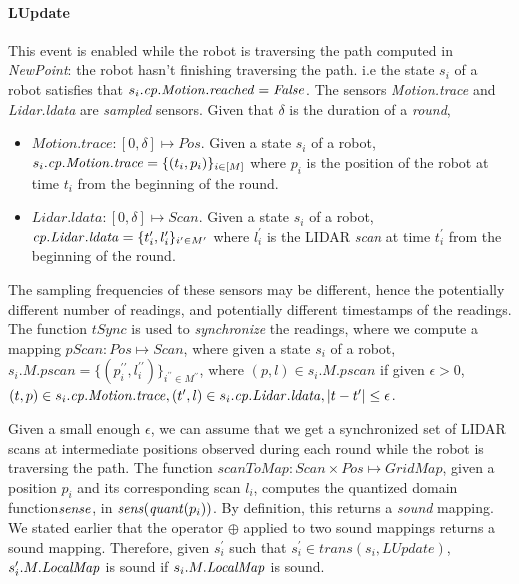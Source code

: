 \paragraph{LUpdate}
This event is enabled while the robot is traversing the path computed in \emph{NewPoint}: the robot hasn't finishing traversing the path. i.e the state $s_i$ of a robot satisfies that $s_i.\mathit{cp}.\mathit{Motion.reached}  = \mathit{False}$. The sensors \emph{Motion.trace} and \emph{Lidar.ldata} are \emph{sampled} sensors. Given that $\delta$ is the duration of a \emph{round},
\begin{itemize}
    \item $\mathit{Motion.trace}: [0,\delta] \mapsto \mathit{Pos}$. Given a state $s_i$ of a robot,  $s_i.\mathit{cp}.\mathit{Motion.trace} = \{(t_i, p_i)\}_{i \in [M]}$ where $p_i$ is the position of the robot at time $t_i$ from the beginning of the round.
    \item  $\mathit{Lidar.ldata} : [0,\delta]\mapsto \mathit{Scan}$. Given a state $s_i$ of a robot, $\mathit{cp}.\mathit{Lidar.ldata} = \{t_i^\prime, l_i^\prime\}_{i^\prime \in M^\prime}$ where $l_i^\prime$ is the LIDAR \emph{scan} at time $t_i^\prime$ from the beginning of the round.
\end{itemize}
The sampling frequencies of these sensors may be different, hence the potentially different number of readings, and potentially different timestamps of the readings. The function $\mathit{tSync}$ is used to \emph{synchronize} the readings, where we compute a mapping $\mathit{pScan}: \mathit{Pos} \mapsto \mathit{Scan}$, where given a state $s_i$ of a robot, $s_i.M.\mathit{pscan} = \{(p_i^{\prime\prime}, l_i^{\prime\prime})\}_{i^{\prime\prime} \in M ^{\prime\prime}}$, where  $(p, l) \in s_i.M.\mathit{pscan}$ if given $\epsilon > 0$,  $(t,p) \in s_i.\mathit{cp}.\mathit{Motion.trace}, (t^\prime,l )\in s_i.\mathit{cp}.\mathit{Lidar.ldata}, |t - t^\prime| \leq \epsilon$.

Given a small enough $\epsilon$, we can assume that we get a synchronized set of LIDAR scans at intermediate positions observed during each round while the robot is traversing the path. The function $\mathit{scanToMap}: \mathit{Scan} \times \mathit{Pos}\mapsto \mathit{GridMap}$, given a position $p_i$ and its corresponding scan $l_i$, computes the quantized domain function$\mathit{sense}$, in $\mathit{sens}(\mathit{quant}(p_i))$. By definition, this returns a \emph{sound} mapping. We stated earlier that the operator $\oplus$ applied to two sound mappings returns a sound mapping. Therefore, given $s_i^\prime$ such that $\mathit{s_i^\prime \in \mathit{trans}(s_i,\mathit{LUpdate})}$,  $s_i^\prime.M.\mathit{LocalMap}$ is sound if $s_i.M.\mathit{LocalMap}$ is sound.

